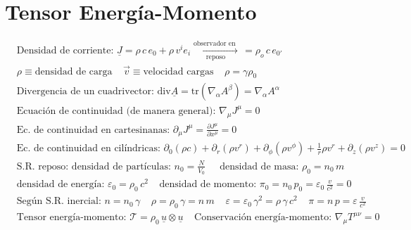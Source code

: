 \section*{Tensor Energía-Momento}
\begin{align*}
    &\text{Densidad de corriente: } \underline{J} =  \rho \,c\, e_0+ \rho \, v^ie_i  \xrightarrow[\text{reposo}]{\text{observador en }} \, =\rho_o \,c\, e_{0'}\\
    &  \rho\equiv \text{densidad de carga}\; \; \; \; \vec{v}\equiv \text{velocidad cargas}\; \; \; \; \rho=\gamma  \rho_0\\
    &\text{Divergencia de un cuadrivector: }\text{div}\underline{A}=\text{tr}(\nabla_\alpha A^\beta) = \nabla_\alpha A^\alpha \\
    &\text{Ecuación de continuidad (de manera general): }\nabla_\mu J^\mu =0\\
    &\text{Ec. de continuidad en cartesinanas: }\partial_\mu J^\mu = \frac{\partial J^\mu}{\partial x^\mu}=0 \\
    &\text{Ec. de continuidad en cilíndricas: } \partial_0 (\rho c) \!+\! \partial_r (\rho v^r ) \!+\! \partial_\phi (\rho v^\phi)+ \frac{1}{r}\rho v^r \!+\! \partial_z (\rho v^z)\!=\!0\\
    &\text{S.R. reposo: densidad de partículas: }n_0 = \frac{N}{V_0}\; \; \; \;
    \text{ densidad de masa: $\rho_0=n_0\, m$}\\
    &\text{densidad de energía: $\varepsilon_0=\rho_0\, c^2$}\; \; \; \;  
    \text{densidad de momento: } \pi_0=n_0\, p_0=\varepsilon_0 \, \frac{v}{c^2}=0\\
    &\text{Según S.R. inercial: $n\!=\!n_0\, \gamma \; \; \; \; \rho\!=\!\rho_0\, \gamma\!=\!n\,m\;\; \; \; \varepsilon\!=\!\varepsilon_0\,\gamma^2\!=\rho\, \gamma \, c^2 \; \; \; \; \pi\!=\!n\, p\!=\!\varepsilon\, \frac{v}{c^2} $}\\
    &\text{Tensor energía-momento: }\mathcal{T}\!=\!\rho_0 \, \underline{u}\!\otimes \!\underline{u}\;\; \;\; \text{Conservación energía-momento: }\nabla_\mu T^{\mu\nu}\!=\!0
\end{align*}